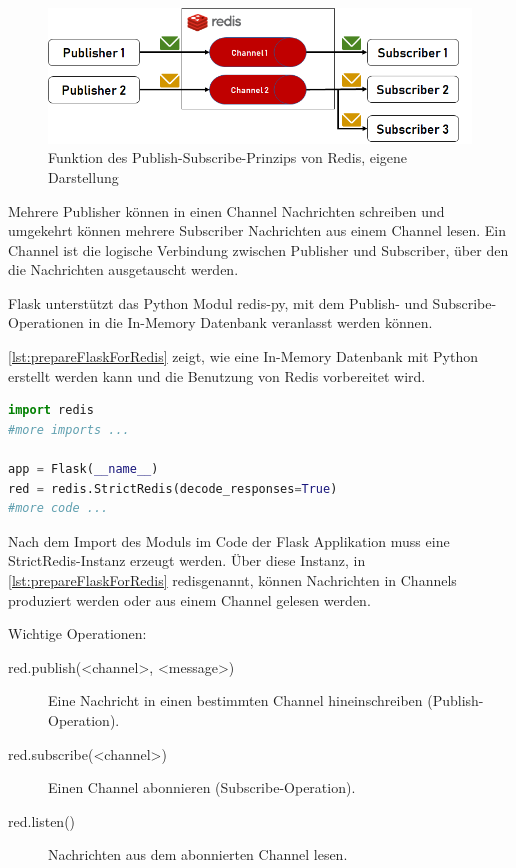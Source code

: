 \documentclass[a4paper,titlepage,halfparskip,12pt]{scrreprt}
\begin{document}
\begin{onehalfspacing}
\begin{figure}[h]
	\centering
	\includegraphics[width=\textwidth]{images/RedisFunction}
	\caption{Funktion des Publish-Subscribe-Prinzips von Redis, eigene Darstellung}
	\label{img:RedisFunction}
\end{figure}

Mehrere Publisher können in einen Channel Nachrichten schreiben und umgekehrt können mehrere Subscriber Nachrichten aus einem Channel lesen. Ein Channel ist die logische Verbindung zwischen Publisher und Subscriber, über den die Nachrichten ausgetauscht werden.\cite{redisDocumentation}

Flask unterstützt das Python Modul redis-py, mit dem Publish- und Subscribe-Operationen in die In-Memory Datenbank veranlasst werden können.

\autoref{lst:prepareFlaskForRedis} zeigt, wie eine In-Memory Datenbank mit Python erstellt werden kann und die Benutzung von Redis vorbereitet wird.

\begin{lstlisting}[language=python, caption={Code für die Einbindung von Redis in die Flask Applikation}, label={lst:prepareFlaskForRedis}]
import redis
#more imports ...

app = Flask(__name__)
red = redis.StrictRedis(decode_responses=True)
#more code ...
\end{lstlisting}

Nach dem Import des Moduls im Code der Flask Applikation muss eine StrictRedis-Instanz erzeugt werden. Über diese Instanz, in \autoref{lst:prepareFlaskForRedis} \glqq redis\grqq genannt, können Nachrichten in Channels produziert werden oder aus einem Channel gelesen werden.

\pagebreak

Wichtige Operationen:

\begin{description}
\item[red.publish(<channel>, <message>)] Eine Nachricht in einen bestimmten Channel hineinschreiben (Publish-Operation).
\item[red.subscribe(<channel>)] Einen Channel abonnieren (Subscribe-Operation).
\item[red.listen()] Nachrichten aus dem abonnierten Channel lesen.
\end{description}


\end{onehalfspacing}
\end{document}
